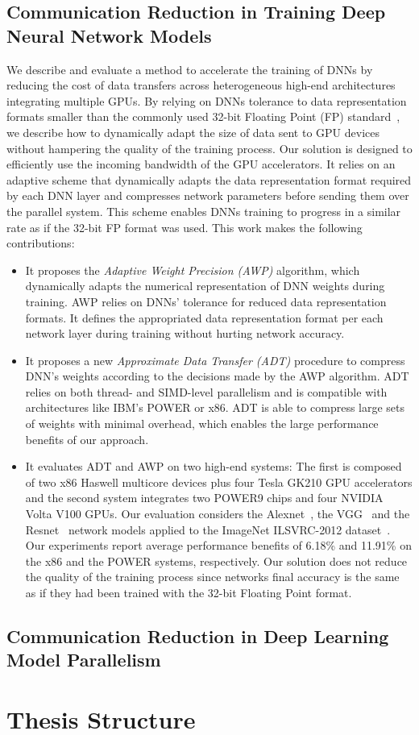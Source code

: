 \subsection{Communication Reduction in Training Deep Neural Network Models}
We describe and evaluate a method to accelerate the training of DNNs by reducing the cost 
of data transfers across heterogeneous high-end architectures integrating multiple GPUs. By relying on DNNs 
tolerance to data representation formats smaller than the commonly used 32-bit Floating 
Point (FP) standard~\cite{gupta15, flexpoint17}, we describe how to dynamically adapt 
the size of data sent to GPU devices without hampering the quality of the training process. 
Our solution is designed to efficiently use the incoming bandwidth of the GPU accelerators.
It relies on an adaptive scheme that dynamically adapts the data representation format required 
by each DNN layer and compresses network parameters before sending them over the parallel system.
This scheme enables DNNs training to progress in a similar rate as if the 32-bit FP format was used.
This work makes the following contributions:
\begin{itemize}
    \item It proposes the {\it Adaptive Weight Precision (AWP)} algorithm, which 
        dynamically adapts the numerical representation of DNN weights during training. 
        AWP relies on DNNs' tolerance for reduced data representation formats.  
        It defines the appropriated data representation format per each network layer during  
        training without hurting network accuracy.

    \item It proposes a new {\it Approximate Data Transfer (ADT)} procedure to compress 
        DNN's weights according to the decisions made by the AWP algorithm. 
        ADT relies on both thread- and SIMD-level parallelism  
        and is compatible with architectures like IBM's POWER 
        or x86. ADT is able to compress large 
        sets of weights with minimal overhead, which enables the large performance benefits of our approach.

    \item It evaluates ADT and AWP on 
        two high-end systems: The first is composed of two x86 Haswell multicore 
        devices plus four Tesla GK210 GPU accelerators and the second system integrates two POWER9 chips and four NVIDIA Volta V100 GPUs. 
        Our evaluation considers the Alexnet~\cite{alexnet}, the VGG~\cite{vgg} and the Resnet~\cite{resnet} network models applied to 
        the ImageNet ILSVRC-2012 dataset~\cite{imagenet}.
        Our experiments report average performance benefits of 6.18\% and 11.91\% on the x86 and the POWER systems, respectively.
        Our solution does not reduce the quality of the training process since networks final accuracy is the same as if they had been trained with the 32-bit Floating Point format.
\end{itemize}

\subsection{Communication Reduction in Deep Learning Model Parallelism}


\section{Thesis Structure}
